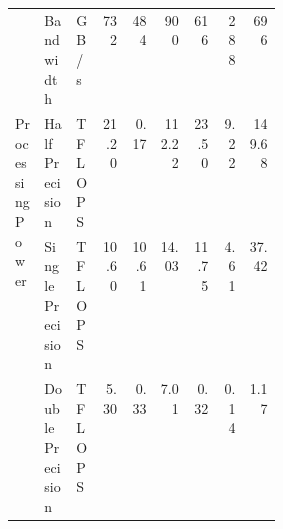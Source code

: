 \begin{tabular}{p{0.11\linewidth}p{0.12\linewidth}p{0.082\linewidth}|rrrrrr}
    \cline{2-9}
                                                  & Bandwidth                & GB/s          & 732   & 484    & 900    & 616    & 288    & 696    \\
    \cline{1-9} \cline{2-9}
    \multirow[t]{3}{\linewidth}{Processing Power} & Half Precision           & \small TFLOPS & 21.20 & 0.17   & 112.22 & 23.50  & 9.22   & 149.68 \\
    \cline{2-9}
                                                  & Single Precision         & \small TFLOPS & 10.60 & 10.61  & 14.03  & 11.75  & 4.61   & 37.42  \\
    \cline{2-9}
                                                  & Double Precision         & \small TFLOPS & 5.30  & 0.33   & 7.01   & 0.32   & 0.14   & 1.17   \\
    \bottomrule
\end{tabular}
